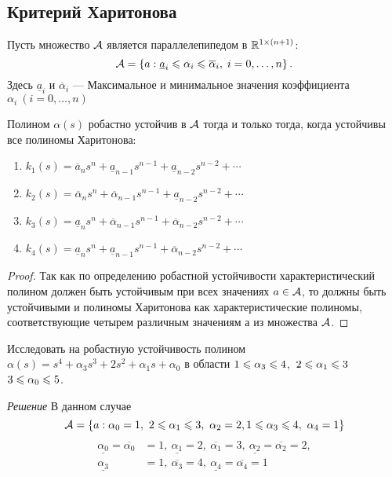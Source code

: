 \documentclass[../../TAU.tex]{subfiles}
\begin{document}
\subsection{Критерий Харитонова}

    Пусть множество $\mathcal{A}$ является параллелепипедом в $\mathbb{R}^{1\times (n+1)}$:
    $$
        \mathcal{A}=\left\{a: \underline{ a}_i\leqslant \alpha_i \leqslant \overline \alpha_i, \; i=0,\ldots,n\right\}.
    $$
    Здесь $\underline{a}_i$ и $\overline \alpha_i$ ---
    Максимальное и минимальное значения коэффициента $\alpha_i\ (i=0,\dots,n)$

    \begin{theor}
        Полином $\alpha(s)$ робастно устойчив в $\mathcal{A}$ тогда и только тогда, когда устойчивы все полиномы Харитонова:
        \begin{enumerate}
            \item 
                $k_1(s) = \overline{a}_n s^n + \underline{ a}_{n-1} s^{n-1} + \underline{ a}_{n-2} s^{n-2} + \cdots$
            \item 
                $k_2(s) = \overline \alpha_n s^n + \overline \alpha_{n-1} s^{n-1} + \underline{ a}_{n-2} s^{n-2} + \cdots$
            \item 
                $k_3(s) = \underline{ a}_n s^n + \overline \alpha_{n-1} s^{n-1} + \overline \alpha_{n-2} s^{n-2} + \cdots$
            \item 
                $k_4(s) = \underline{ a}_n s^n + \underline{ a}_{n-1} s^{n-1} + \overline \alpha_{n-2} s^{n-2} + \cdots$
        \end{enumerate}

    \end{theor}

    \begin{proof}
        Так как по определению робастной устойчивости характеристический полином должен быть устойчивым при всех значениях $a\in \mathcal{A}$, то должны быть устойчивыми и полиномы Харитонова как характеристические полиномы, соответствующие четырем различным значениям $а$ из множества $\mathcal{A}$.
    \end{proof}

    \examp Исследовать на робастную устойчивость полином $\alpha(s) = s^4 + \alpha_3 s^3 + 2 s^2 + \alpha_1 s + \alpha_0$ в области $1\leqslant \alpha_3 \leqslant 4$,\ $ 2 \leqslant \alpha_1 \leqslant 3$ $3\leqslant \alpha_0\leqslant5$.

    {\it Решение}
    В данном случае 
    $$
        \IT{A} = \left\{a: \alpha_0=1,\ 2\lse \alpha_1 \lse 3,\ \alpha_2 = 2, 1\lse \alpha_3\lse 4,\ \alpha_4=1\right\}
    $$
    \begin{align*}
        \underline{\alpha_0}=\overline{\alpha_0}&=1,\ 
        \underline{\alpha_1}=2,\ \overline{\alpha_1}=3,\
        \underline{\alpha_2}=\overline{\alpha_2}=2,\\
        \underline{\alpha_3}&=1,\ \overline{\alpha_3}=4,\ 
        \underline{\alpha_4}=\overline{\alpha_4}=1
    \end{align*}
\end{document}
